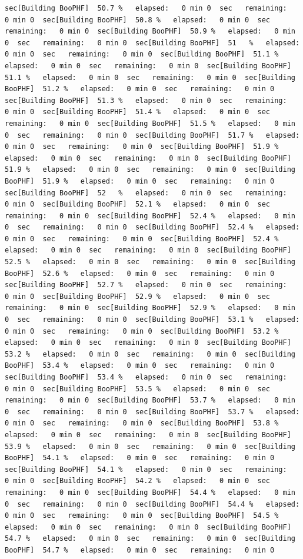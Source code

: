 \documentclass[
]{book}
\begin{document}
\begin{verbatim}
sec[Building BooPHF]  50.7 %   elapsed:   0 min 0  sec   remaining:   0 min 0  sec[Building BooPHF]  50.8 %   elapsed:   0 min 0  sec   remaining:   0 min 0  sec[Building BooPHF]  50.9 %   elapsed:   0 min 0  sec   remaining:   0 min 0  sec[Building BooPHF]  51   %   elapsed:   0 min 0  sec   remaining:   0 min 0  sec[Building BooPHF]  51.1 %   elapsed:   0 min 0  sec   remaining:   0 min 0  sec[Building BooPHF]  51.1 %   elapsed:   0 min 0  sec   remaining:   0 min 0  sec[Building BooPHF]  51.2 %   elapsed:   0 min 0  sec   remaining:   0 min 0  sec[Building BooPHF]  51.3 %   elapsed:   0 min 0  sec   remaining:   0 min 0  sec[Building BooPHF]  51.4 %   elapsed:   0 min 0  sec   remaining:   0 min 0  sec[Building BooPHF]  51.5 %   elapsed:   0 min 0  sec   remaining:   0 min 0  sec[Building BooPHF]  51.7 %   elapsed:   0 min 0  sec   remaining:   0 min 0  sec[Building BooPHF]  51.9 %   elapsed:   0 min 0  sec   remaining:   0 min 0  sec[Building BooPHF]  51.9 %   elapsed:   0 min 0  sec   remaining:   0 min 0  sec[Building BooPHF]  51.9 %   elapsed:   0 min 0  sec   remaining:   0 min 0  sec[Building BooPHF]  52   %   elapsed:   0 min 0  sec   remaining:   0 min 0  sec[Building BooPHF]  52.1 %   elapsed:   0 min 0  sec   remaining:   0 min 0  sec[Building BooPHF]  52.4 %   elapsed:   0 min 0  sec   remaining:   0 min 0  sec[Building BooPHF]  52.4 %   elapsed:   0 min 0  sec   remaining:   0 min 0  sec[Building BooPHF]  52.4 %   elapsed:   0 min 0  sec   remaining:   0 min 0  sec[Building BooPHF]  52.5 %   elapsed:   0 min 0  sec   remaining:   0 min 0  sec[Building BooPHF]  52.6 %   elapsed:   0 min 0  sec   remaining:   0 min 0  sec[Building BooPHF]  52.7 %   elapsed:   0 min 0  sec   remaining:   0 min 0  sec[Building BooPHF]  52.9 %   elapsed:   0 min 0  sec   remaining:   0 min 0  sec[Building BooPHF]  52.9 %   elapsed:   0 min 0  sec   remaining:   0 min 0  sec[Building BooPHF]  53.1 %   elapsed:   0 min 0  sec   remaining:   0 min 0  sec[Building BooPHF]  53.2 %   elapsed:   0 min 0  sec   remaining:   0 min 0  sec[Building BooPHF]  53.2 %   elapsed:   0 min 0  sec   remaining:   0 min 0  sec[Building BooPHF]  53.4 %   elapsed:   0 min 0  sec   remaining:   0 min 0  sec[Building BooPHF]  53.4 %   elapsed:   0 min 0  sec   remaining:   0 min 0  sec[Building BooPHF]  53.5 %   elapsed:   0 min 0  sec   remaining:   0 min 0  sec[Building BooPHF]  53.7 %   elapsed:   0 min 0  sec   remaining:   0 min 0  sec[Building BooPHF]  53.7 %   elapsed:   0 min 0  sec   remaining:   0 min 0  sec[Building BooPHF]  53.8 %   elapsed:   0 min 0  sec   remaining:   0 min 0  sec[Building BooPHF]  53.9 %   elapsed:   0 min 0  sec   remaining:   0 min 0  sec[Building BooPHF]  54.1 %   elapsed:   0 min 0  sec   remaining:   0 min 0  sec[Building BooPHF]  54.1 %   elapsed:   0 min 0  sec   remaining:   0 min 0  sec[Building BooPHF]  54.2 %   elapsed:   0 min 0  sec   remaining:   0 min 0  sec[Building BooPHF]  54.4 %   elapsed:   0 min 0  sec   remaining:   0 min 0  sec[Building BooPHF]  54.4 %   elapsed:   0 min 0  sec   remaining:   0 min 0  sec[Building BooPHF]  54.5 %   elapsed:   0 min 0  sec   remaining:   0 min 0  sec[Building BooPHF]  54.7 %   elapsed:   0 min 0  sec   remaining:   0 min 0  sec[Building BooPHF]  54.7 %   elapsed:   0 min 0  sec   remaining:   0 min 0  
\end{verbatim}
\end{document}
